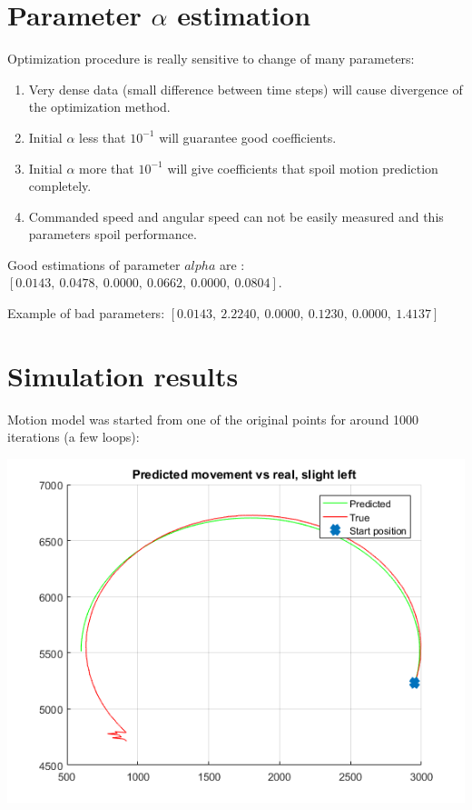\documentclass[a4paper, 12pt]{article}
\begin{document}
\section{Parameter $\alpha$ estimation}

Optimization procedure is really sensitive to change of many parameters:
\begin{enumerate}
\item Very dense data (small difference between time steps) will cause divergence of the optimization method.
\item Initial $\alpha$ less that $10^{-1}$ will guarantee good coefficients.
\item  Initial $\alpha$ more that $10^{-1}$ will give coefficients that spoil motion prediction completely.
\item Commanded speed and angular speed can not be easily measured and this parameters spoil performance.
\end{enumerate}
 
 \medskip
 Good estimations of parameter $alpha$ are :$[ 0.0143,~    0.0478,~    0.0000 ,~   0.0662,~    0.0000 ,~   0.0804].$
 \medskip
 
 Example of bad parameters:  $[0.0143,~    2.2240,~    0.0000 ,~   0.1230 ,~   0.0000 ,~   1.4137]$


\section{Simulation results}

Motion model was started from one of the original points for around 1000 iterations (a few loops):

\includegraphics[scale = 1]{gl.png}
\end{document}
